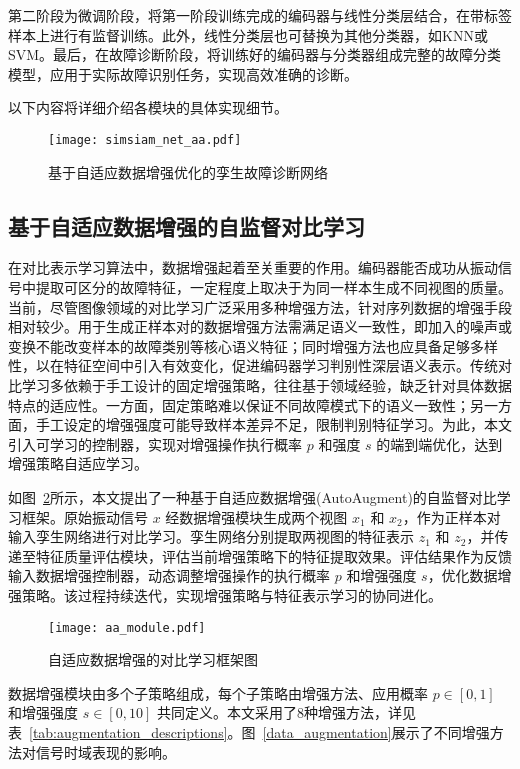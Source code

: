 \documentclass[master]{thesis-uestc}
\begin{document}
第二阶段为微调阶段，将第一阶段训练完成的编码器与线性分类层结合，在带标签样本上进行有监督训练。此外，线性分类层也可替换为其他分类器，如KNN或SVM。最后，在故障诊断阶段，将训练好的编码器与分类器组成完整的故障分类模型，应用于实际故障识别任务，实现高效准确的诊断。

以下内容将详细介绍各模块的具体实现细节。

\begin{figure}[h]
    \centering
    \texttt{[image: simsiam\_net\_aa.pdf]}
    \caption{基于自适应数据增强优化的孪生故障诊断网络}
    \label{simsiam_net}
\end{figure}
\FloatBarrier  %
\subsection{基于自适应数据增强的自监督对比学习}

在对比表示学习算法中，数据增强起着至关重要的作用。编码器能否成功从振动信号中提取可区分的故障特征，一定程度上取决于为同一样本生成不同视图的质量。当前，尽管图像领域的对比学习广泛采用多种增强方法，针对序列数据的增强手段相对较少。用于生成正样本对的数据增强方法需满足语义一致性，即加入的噪声或变换不能改变样本的故障类别等核心语义特征；同时增强方法也应具备足够多样性，以在特征空间中引入有效变化，促进编码器学习判别性深层语义表示。传统对比学习多依赖于手工设计的固定增强策略，往往基于领域经验，缺乏针对具体数据特点的适应性。一方面，固定策略难以保证不同故障模式下的语义一致性；另一方面，手工设定的增强强度可能导致样本差异不足，限制判别特征学习。为此，本文引入可学习的控制器，实现对增强操作执行概率 \(p\) 和强度 \(s\) 的端到端优化，达到增强策略自适应学习。

如图~\ref{aa_module}所示，本文提出了一种基于自适应数据增强(AutoAugment)的自监督对比学习框架。原始振动信号 \(x\) 经数据增强模块生成两个视图 \(x_1\) 和 \(x_2\)，作为正样本对输入孪生网络进行对比学习。孪生网络分别提取两视图的特征表示 \(z_1\) 和 \(z_2\)，并传递至特征质量评估模块，评估当前增强策略下的特征提取效果。评估结果作为反馈输入数据增强控制器，动态调整增强操作的执行概率 \(p\) 和增强强度 \(s\)，优化数据增强策略。该过程持续迭代，实现增强策略与特征表示学习的协同进化。

\begin{figure}[h]
    \centering
    \texttt{[image: aa\_module.pdf]}
    \caption{自适应数据增强的对比学习框架图}
    \label{aa_module}
\end{figure}

数据增强模块由多个子策略组成，每个子策略由增强方法、应用概率 \(p \in [0,1]\) 和增强强度 \(s \in [0,10]\) 共同定义。本文采用了8种增强方法，详见表~\ref{tab:augmentation_descriptions}。图~\ref{data_augmentation}展示了不同增强方法对信号时域表现的影响。
\end{document}
